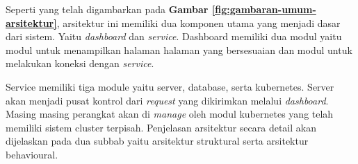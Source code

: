 Seperti yang telah digambarkan pada \textbf{Gambar \ref{fig:gambaran-umum-arsitektur}}, arsitektur ini memiliki dua komponen utama yang menjadi dasar dari sistem. Yaitu \textit{dashboard} dan \textit{service}. Dashboard memiliki dua modul yaitu modul untuk menampilkan halaman halaman yang bersesuaian dan modul untuk melakukan koneksi dengan \textit{service}.

Service memiliki tiga module yaitu server, database, serta kubernetes. Server akan menjadi pusat kontrol dari \textit{request} yang dikirimkan melalui \textit{dashboard}. Masing masing perangkat akan di \textit{manage} oleh modul kubernetes yang telah memiliki sistem cluster terpisah. Penjelasan arsitektur secara detail akan dijelaskan pada dua subbab yaitu arsitektur struktural serta arsitektur behavioural.



